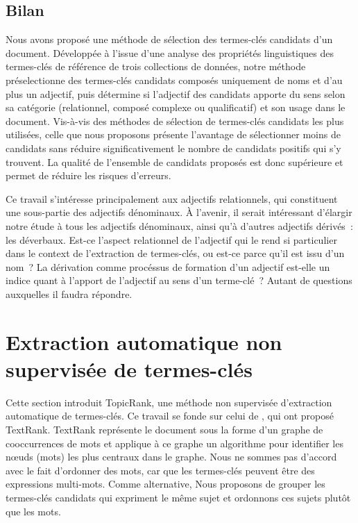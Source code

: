     \subsection{Bilan}
    \label{subsec:main:domain_independent_keyphrase_extraction-keyphrase_candidate_selection-conclusion}
      Nous avons proposé une méthode de sélection des termes-clés candidats d'un
      document. Développée à l'issue d'une analyse des propriétés linguistiques
      des termes-clés de référence de trois collections de données, notre
      méthode préselectionne des termes-clés candidats composés uniquement de
      noms et d'au plus un adjectif, puis détermine si l'adjectif des candidats
      apporte du sens selon sa catégorie (relationnel, composé complexe ou
      qualificatif) et son usage dans le document. Vis-à-vis des méthodes de
      sélection de termes-clés candidats les plus utilisées, celle que nous
      proposons présente l'avantage de sélectionner moins de candidats sans
      réduire significativement le nombre de candidats positifs qui s'y
      trouvent. La qualité de l'ensemble de candidats proposés est donc
      supérieure et permet de réduire les risques d'erreurs.

      Ce travail s'intéresse principalement aux adjectifs relationnels, qui
      constituent une sous-partie des adjectifs dénominaux. À l'avenir, il
      serait intéressant d'élargir notre étude à tous les adjectifs dénominaux,
      ainsi qu'à d'autres adjectifs dérivés~: les déverbaux. Est-ce l'aspect
      relationnel de l'adjectif qui le rend si particulier dans le context de
      l'extraction de termes-clés, ou est-ce parce qu'il est issu d'un nom~? La
      dérivation comme procéssus de formation d'un adjectif est-elle un indice
      quant à l'apport de l'adjectif au sens d'un terme-clé~? Autant de
      questions auxquelles il faudra répondre.


  \section{Extraction automatique non supervisée de termes-clés}
  \label{sec:main:domain_independent_keyphrase_extraction-unsupervised_automatic_keyphrase_extraction}
    Cette section introduit TopicRank, une méthode non supervisée d'extraction
    automatique de termes-clés. Ce travail se fonde sur celui de
    , qui ont proposé TextRank. TextRank
    représente le document sous la forme d'un graphe de cooccurrences de mots et
    applique à ce graphe un algorithme pour identifier les n\oe{}uds (mots) les
    plus centraux dans le graphe. Nous ne sommes pas d'accord avec le fait
    d'ordonner des mots, car que les termes-clés peuvent être des expressions
    multi-mots. Comme alternative, Nous proposons de grouper les termes-clés
    candidats qui expriment le même sujet et ordonnons ces sujets plutôt que les
    mots.

